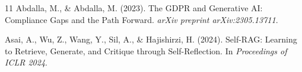 \documentclass{article}
\begin{document}
\begin{thebibliography}{11}
Abdalla, M., \& Abdalla, M. (2023).
\newblock The {GDPR} and Generative {AI}: Compliance Gaps and the Path Forward.
\newblock \emph{arXiv preprint arXiv:2305.13711}.

Asai, A., Wu, Z., Wang, Y., Sil, A., \& Hajishirzi, H. (2024).
\newblock Self-{RAG}: Learning to Retrieve, Generate, and Critique through
  Self-Reflection.
\newblock In \emph{Proceedings of ICLR 2024}.

\end{thebibliography}
\end{document}
